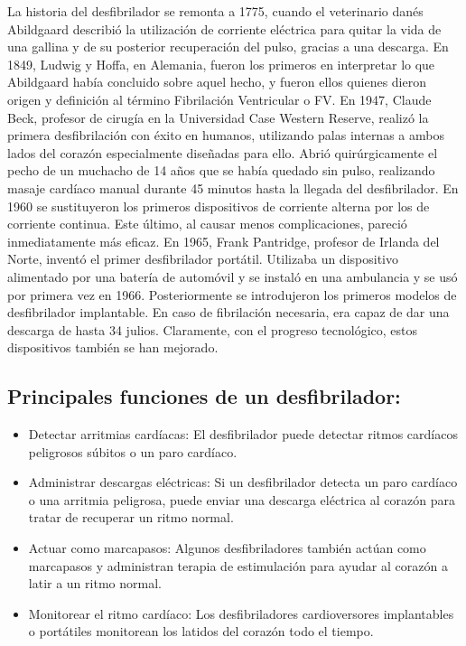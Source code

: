 La historia del desfibrilador se remonta a 1775, cuando el veterinario danés Abildgaard describió la utilización de corriente eléctrica para quitar la vida de una gallina y de su posterior recuperación del pulso, gracias a una descarga. En 1849, Ludwig y Hoffa, en Alemania, fueron los primeros en interpretar lo que Abildgaard había concluido sobre aquel hecho, y fueron ellos quienes dieron origen y definición al término Fibrilación Ventricular o FV. En 1947, Claude Beck, profesor de cirugía en la Universidad Case Western Reserve, realizó la primera desfibrilación con éxito en humanos, utilizando palas internas a ambos lados del corazón especialmente diseñadas para ello. Abrió quirúrgicamente el pecho de un muchacho de 14 años que se había quedado sin pulso, realizando masaje cardíaco manual durante 45 minutos hasta la llegada del desfibrilador. \newline \hfill \break
En 1960 se sustituyeron los primeros dispositivos de corriente alterna por los de corriente continua. Este último, al causar menos complicaciones, pareció inmediatamente más eficaz. En 1965, Frank Pantridge, profesor de Irlanda del Norte, inventó el primer desfibrilador portátil. Utilizaba un dispositivo alimentado por una batería de automóvil y se instaló en una ambulancia y se usó por primera vez en 1966. Posteriormente se introdujeron los primeros modelos de desfibrilador implantable. En caso de fibrilación necesaria, era capaz de dar una descarga de hasta 34 julios. Claramente, con el progreso tecnológico, estos dispositivos también se han mejorado.

\subsection{Principales funciones de un desfibrilador:}
\begin{itemize}
    \item Detectar arritmias cardíacas: El desfibrilador puede detectar ritmos cardíacos peligrosos súbitos o un paro cardíaco.
    \item Administrar descargas eléctricas: Si un desfibrilador detecta un paro cardíaco o una arritmia peligrosa, puede enviar una descarga eléctrica al corazón para tratar de recuperar un ritmo normal.
    \item Actuar como marcapasos: Algunos desfibriladores también actúan como marcapasos y administran terapia de estimulación para ayudar al corazón a latir a un ritmo normal.
    \item Monitorear el ritmo cardíaco: Los desfibriladores cardioversores implantables o portátiles monitorean los latidos del corazón todo el tiempo.
\end{itemize}

